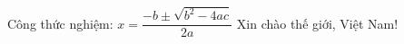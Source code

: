 ﻿\documentclass[preview,border=2pt]{standalone}
\begin{document}
Công thức nghiệm: $x=\dfrac{-b\pm\sqrt{b^2-4ac}}{2a}$ \quad Xin chào thế giới, Việt Nam!
\end{document}
